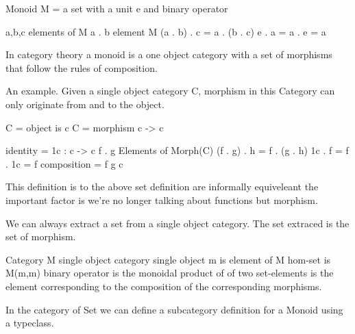 \documentclass[12pt, letterpaper]{article}
\begin{document}
Monoid M = a set with a unit e and binary operator

a,b,c elements of M
a . b element M
(a . b) . c = a . (b . c)
e . a = a . e = a

In category theory a monoid is a one object category with a set of morphisms that follow the rules of composition.

An example. Given a single object category C, morphism in this Category can only originate from and to the object.

C = object is c 
C = morphism c -> c 

identity = 1c : c -> c
f . g Elements of Morph(C)
(f . g) . h = f . (g . h)
1c . f = f . 1c = f
composition = f g c

This definition is to the above set definition are informally equiveleant the important factor is we're no longer talking about functions but morphism.

We can always extract a set from a single object category. The set extraced is the set of morphism.

Category M single object category
single object m is element of M
hom-set is M(m,m)
binary operator is the monoidal product of of two set-elements is the element corresponding to the composition of the corresponding morphisms.


In the category of Set we can define a subcategory definition for a Monoid using a typeclass.
\end{document}
